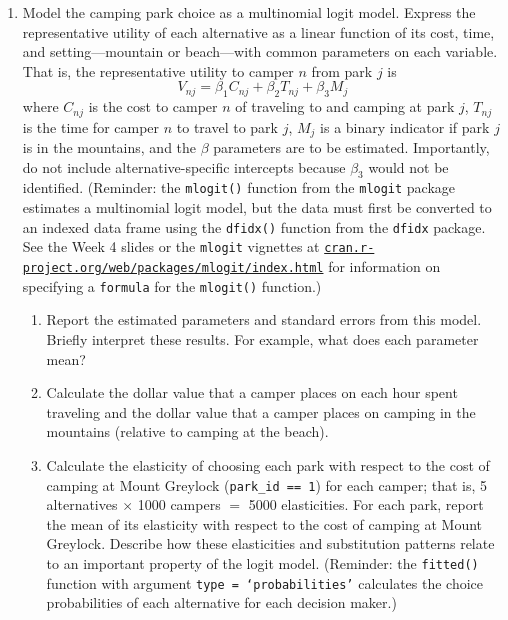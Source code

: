 \documentclass[11pt,letterpaper]{article}
\begin{document}
\begin{enumerate}[label=\alph*., leftmargin=*]
	\item Model the camping park choice as a multinomial logit model. Express the representative utility of each alternative as a linear function of its cost, time, and setting---mountain or beach---with common parameters on each variable. That is, the representative utility to camper $n$ from park $j$ is
	$$V_{nj} = \beta_1 C_{nj} + \beta_2 T_{nj} + \beta_3 M_j$$
	where $C_{nj}$ is the cost to camper $n$ of traveling to and camping at park $j$, $T_{nj}$ is the time for camper $n$ to travel to park $j$, $M_j$ is a binary indicator if park $j$ is in the mountains, and the $\beta$ parameters are to be estimated. Importantly, do not include alternative-specific intercepts because $\beta_3$ would not be identified. (Reminder: the \texttt{mlogit()} function from the \texttt{mlogit} package estimates a multinomial logit model, but the data must first be converted to an indexed data frame using the \texttt{dfidx()} function from the \texttt{dfidx} package. See the Week 4 slides or the \texttt{mlogit} vignettes at \href{https://cran.r-project.org/web/packages/mlogit/index.html}{\texttt{cran.r-project.org/web/packages/mlogit/index.html}} for information on specifying a \texttt{formula} for the \texttt{mlogit()} function.)

	\begin{enumerate}[label=\roman*.]
		\item Report the estimated parameters and standard errors from this model. Briefly interpret these results. For example, what does each parameter mean?

		\item Calculate the dollar value that a camper places on each hour spent traveling and the dollar value that a camper places on camping in the mountains (relative to camping at the beach).

		\item Calculate the elasticity of choosing each park with respect to the cost of camping at Mount Greylock (\texttt{park\_id == 1}) for each camper; that is, 5 alternatives $\times$ 1000 campers $=$ 5000 elasticities. For each park, report the mean of its elasticity with respect to the cost of camping at Mount Greylock. Describe how these elasticities and substitution patterns relate to an important property of the logit model. (Reminder: the \texttt{fitted()} function with argument \texttt{type = `probabilities'} calculates the choice probabilities of each alternative for each decision maker.)
	\end{enumerate}


\end{enumerate}
\end{document}
